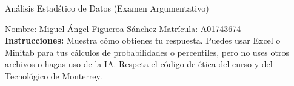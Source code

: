 \documentclass[8pt]{report}
\begin{document}
\newpage



\begin{center}
{An\'alisis Estad\'stico de Datos (Examen Argumentativo)}
\end{center}

Nombre: \underline{\hspace*{.2in}}
Miguel Ángel Figueroa Sánchez
\underline{\hspace*{.2in}} \quad Matr\'icula:\underline{\hspace*{.2in}}
A01743674
\underline{\hspace*{.2in}} \\

{\bf Instrucciones:} Muestra c\'omo obtienes tu respuesta. Puedes usar Excel 
o Minitab para tus cálculos de probabilidades o 
percentiles, pero no uses otros archivos o hagas uso de la IA. Respeta el 
c\'odigo de \'etica del curso y del Tecnol\'ogico 
de Monterrey.
\end{document}
